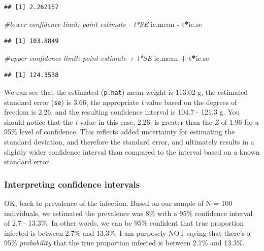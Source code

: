 \documentclass[
]{book}
\newenvironment{Shaded}{\begin{snugshade}}{\end{snugshade}}
\newcommand{\CommentTok}[1]{\textcolor[rgb]{0.56,0.35,0.01}{\textit{#1}}}
\newcommand{\NormalTok}[1]{#1}
\newcommand{\SpecialCharTok}[1]{\textcolor[rgb]{0.81,0.36,0.00}{\textbf{#1}}}
\begin{document}
\begin{verbatim}
## [1] 2.262157
\end{verbatim}

\begin{Shaded}
\begin{Highlighting}[]
\CommentTok{\#lower confidence limit: point estimate {-} t*SE}
\NormalTok{ic.mean }\SpecialCharTok{{-}}\NormalTok{ t}\SpecialCharTok{*}\NormalTok{ic.se}
\end{Highlighting}
\end{Shaded}

\begin{verbatim}
## [1] 103.8849
\end{verbatim}

\begin{Shaded}
\begin{Highlighting}[]
\CommentTok{\#upper confidence limit: point estimate + t*SE}
\NormalTok{ic.mean }\SpecialCharTok{+}\NormalTok{ t}\SpecialCharTok{*}\NormalTok{ic.se}
\end{Highlighting}
\end{Shaded}

\begin{verbatim}
## [1] 124.3538
\end{verbatim}

We can see that the estimated (\texttt{p.hat}) mean weight is 113.02 g, the estimated standard error (\texttt{se}) is 3.66, the appropriate \emph{t} value based on the degrees of freedom is 2.26, and the resulting confidence interval is 104.7 - 121.3 g. You should notice that the \emph{t} value in this case, 2.26, is greater than the \emph{Z} of 1.96 for a 95\% level of confidence. This reflects added uncertainty for estimating the standard deviation, and therefore the standard error, and ultimately results in a slightly wider confidence interval than compared to the interval based on a known standard error.

\subsubsection{Interpreting confidence intervals}\label{interpreting-confidence-intervals}

OK, back to prevalence of the infection. Based on our sample of N = 100 individuals, we estimated the prevalence was 8\% with a 95\% confidence interval of 2.7 - 13.3\%. In other words, we can be 95\% confident that true proportion infected is between 2.7\% and 13.3\%. I am purposely NOT saying that there's a 95\% \emph{probability} that the true proportion infected is between 2.7\% and 13.3\%.
\end{document}
